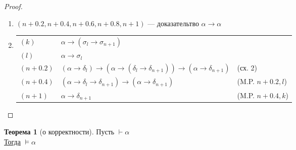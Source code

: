 \documentclass[english]{article}
\theoremstyle{plain}
\theoremstyle{remark}
\theoremstyle{definition}
\newtheorem{theorem}{Теорема}[section]
\begin{document}
\begin{proof}
\begin{description}
\begin{enumerate}
\begin{center}
\begin{tabular}{l|ll}
\end{tabular}
\end{center}
\item \((n + 0.2, n + 0.4, n+0.6, n+0.8, n+1)\) --- доказательтво \(\alpha \to \alpha\)
\item \-
\begin{center}
\begin{tabular}{lll}
\((k)\) & \(\alpha \to (\sigma_l \to \sigma_{n + 1})\) & \\
\((l)\) & \(\alpha \to \sigma_l\) & \\
\((n + 0.2)\) & \((\alpha \to \delta_l) \to (\alpha \to (\delta_l \to \delta_{n + 1})) \to (\alpha \to \delta_{n + 1})\) & (сх. 2)\\
\((n + 0.4)\) & \((\alpha \to \delta_l \to \delta_{n + 1}) \to (\alpha \to \delta_{n + 1})\) & (M.P. \(n + 0.2, l\))\\
\((n + 1)\) & \(\alpha \to \delta_{n + 1}\) & (M.P. \(n + 0.4, k\))\\
\end{tabular}
\end{center}
\end{enumerate}
\end{description}
\end{proof}
\begin{theorem}[о корректности]
Пусть \(\vdash \alpha\) \\
\uline{Тогда} \(\vDash \alpha\)
\end{theorem}
\end{document}
